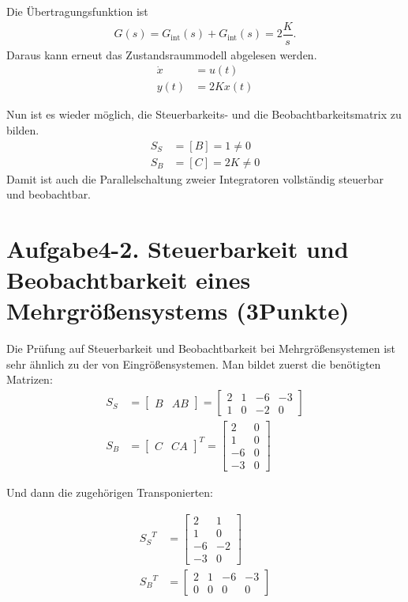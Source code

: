 \documentclass[11pt]{scrartcl} %
\begin{document}
Die Übertragungsfunktion ist
\begin{align*}
G(s) = G_{\text{int}}(s) + G_{\text{int}}(s) = 2\dfrac{K}{s}.
\end{align*}
Daraus kann erneut das Zustandsraummodell abgelesen werden.
\begin{align*}
\dot{x} &= u(t) \\
y(t) &= 2K x(t)
\end{align*}

Nun ist es wieder möglich, die Steuerbarkeits- und die Beobachtbarkeitsmatrix zu bilden.
\begin{align*}
S_S &= \left[B\right]=1 \neq 0 \\
S_B &= \left[C\right] = 2K \neq 0
\end{align*}
Damit ist auch die Parallelschaltung zweier Integratoren vollständig steuerbar und beobachtbar.

\section*{Aufgabe4-2. Steuerbarkeit und Beobachtbarkeit eines Mehrgrößensystems (3Punkte)}
Die Prüfung auf Steuerbarkeit und Beobachtbarkeit bei Mehrgrößensystemen ist sehr ähnlich zu der von Eingrößensystemen. Man bildet zuerst die benötigten Matrizen:
\begin{align*}
S_S &= \begin{bmatrix}
B & AB
\end{bmatrix} = \begin{bmatrix}
2 & 1 & -6 & -3\\
1 & 0 & -2 & 0
\end{bmatrix} \\
S_B &= \begin{bmatrix}
C & CA
\end{bmatrix}^T = \begin{bmatrix}
2 & 0\\
1 & 0\\
-6 & 0\\
-3 & 0
\end{bmatrix}
\end{align*}

Und dann die zugehörigen Transponierten:

\begin{align*}
{S_S}^T &= \begin{bmatrix}
2 & 1\\
1 & 0\\
-6 & -2\\
-3 & 0
\end{bmatrix} \\
{S_B}^T &= \begin{bmatrix}
2 & 1 & -6 & -3\\
0 & 0 & 0 & 0
\end{bmatrix}
\end{align*}
\end{document}
